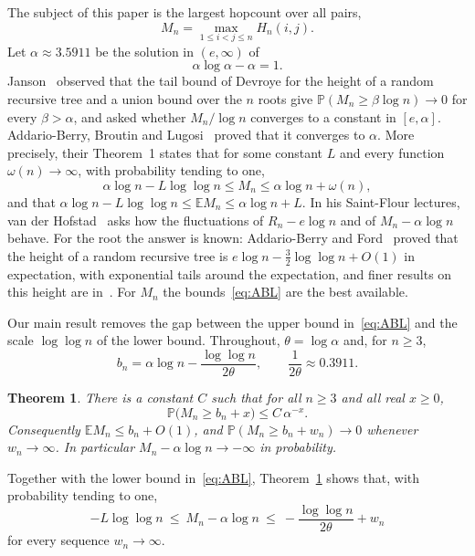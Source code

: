 \documentclass[11pt]{amsart}
\newtheorem{theorem}{Theorem}
\theoremstyle{definition}
\newcommand{\Prob}{\mathbb{P}}
\newcommand{\E}{\mathbb{E}}
\newcommand{\as}{\alpha}
\begin{document}
The subject of this paper is the largest hopcount over all pairs,
\[
M_n=\max_{1\le i<j\le n}H_n(i,j).
\]
Let $\as\approx3.5911$ be the solution in $(e,\infty)$ of
\begin{equation}\label{eq:alpha}
\as\log\as-\as=1 .
\end{equation}
Janson~\cite{Janson} observed that the tail bound of Devroye for the height of a random recursive tree and a union
bound over the $n$ roots give $\Prob(M_n\ge\beta\log n)\to0$ for every $\beta>\as$, and asked whether $M_n/\log n$
converges to a constant in $[e,\as]$. Addario-Berry, Broutin and Lugosi~\cite{ABL} proved that it converges to $\as$. More precisely,
their Theorem~1 states that for some constant $L$ and every function $\omega(n)\to\infty$, with probability tending
to one,
\begin{equation}\label{eq:ABL}
\as\log n-L\log\log n\le M_n\le\as\log n+\omega(n),
\end{equation}
and that $\as\log n-L\log\log n\le\E M_n\le\as\log n+L$. In his Saint-Flour lectures, van der
Hofstad~\cite[Open Problem~3.1]{vdH} asks how the fluctuations of $R_n-e\log n$ and of $M_n-\as\log n$ behave. For
the root the answer is known: Addario-Berry and Ford~\cite{ABF} proved that the height of a random recursive tree is
$e\log n-\tfrac32\log\log n+O(1)$ in expectation, with exponential tails around the expectation, and finer results
on this height are in~\cite{PS1,PS2,ChenMa}. For $M_n$ the bounds~\eqref{eq:ABL} are the best available.

Our main result removes the gap between the upper bound in~\eqref{eq:ABL} and the scale $\log\log n$ of the lower
bound. Throughout, $\theta=\log\as$ and, for $n\ge3$,
\begin{equation}\label{eq:bn}
b_n=\as\log n-\frac{\log\log n}{2\theta},\qquad \frac1{2\theta}\approx0.3911 .
\end{equation}

\begin{theorem}\label{thm:upper}
There is a constant $C$ such that for all $n\ge3$ and all real $x\ge0$,
\[
\Prob\bigl(M_n\ge b_n+x\bigr)\le C\,\as^{-x}.
\]
Consequently $\E M_n\le b_n+O(1)$, and $\Prob(M_n\ge b_n+w_n)\to0$ whenever $w_n\to\infty$. In particular
$M_n-\as\log n\to-\infty$ in probability.
\end{theorem}

Together with the lower bound in~\eqref{eq:ABL}, Theorem~\ref{thm:upper} shows that, with probability tending to
one,
\[
-L\log\log n\ \le\ M_n-\as\log n\ \le\ -\frac{\log\log n}{2\theta}+w_n
\]
for every sequence $w_n\to\infty$.
\end{document}
